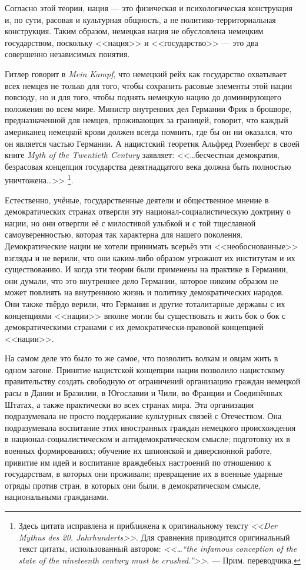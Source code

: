 Согласно этой теории, нация — это физическая и психологическая конструкция и, по сути, расовая и культурная общность, а не политико-территориальная конструкция. Таким образом, немецкая нация не обусловлена немецким государством, поскольку <<нация>> и <<государство>> — это два совершенно независимых понятия.

Гитлер говорит в \textit{Mein Kampf}, что немецкий рейх как государство охватывает всех немцев не только для того, чтобы сохранить расовые элементы этой нации повсюду, но и для того, чтобы поднять немецкую нацию до доминирующего положения во всем мире. Министр внутренних дел Германии Фрик в брошюре, предназначенной для немцев, проживающих за границей, говорит, что каждый американец немецкой крови должен всегда помнить, где бы он ни оказался, что он является частью Германии. А нацистский теоретик Альфред Розенберг в своей книге \textit{Myth of the Twentieth Century} заявляет: <<\ldots бесчестная демократия, безрасовая концепция государства девятнадцатого века должна быть полностью уничтожена\ldots>>
\footnote{%
Здесь цитата исправлена и приближена к оригинальному тексту \textit{<<Der Mythus des 20. Jahrhunderts>>}. Для сравнения приводится оригинальный текст цитаты, использованный автором: \textit{<<\ldots``the infamous conception of the state of the nineteenth century must be crushed.''>>}. — Прим. переводчика.}.

Естественно, учёные, государственные деятели и общественное мнение в демократических странах отвергли эту национал-социалистическую доктрину о нации, но они отвергли её с милостивой улыбкой и с той тщеславной самоуверенностью, которая так характерна для нашего поколения. Демократические нации не хотели принимать всерьёз эти <<необоснованные>> взгляды и не верили, что они каким-либо образом угрожают их институтам и их существованию. И когда эти теории были применены на практике в Германии, они думали, что это внутреннее дело Германии, которое никоим образом не может повлиять на внутреннюю жизнь и политику демократических народов. Они также твёрдо верили, что Германия и другие тоталитарные державы с их концепциями <<нации>> вполне могли бы существовать и жить бок о бок с демократическими странами с их демократически-правовой концепцией <<нации>>.

На самом деле это было то же самое, что позволить волкам и овцам жить в одном загоне. Принятие нацистской концепции нации позволило нацистскому правительству создать свободную от ограничений организацию граждан немецкой расы в Дании и Бразилии, в Югославии и Чили, во Франции и Соединённых Штатах, а также практически во всех странах мира. Эта организация подразумевала не просто поддержание культурных связей с Отечеством. Она подразумевала воспитание этих иностранных граждан немецкого происхождения в национал-социалистическом и антидемократическом смысле; подготовку их в военных формированиях; обучение их шпионской и диверсионной работе, привитие им идей и воспитание враждебных настроений по отношению к государствам, в которых они проживали; превращение их в военные ударные отряды против стран, в которых они были, в демократическом смысле, национальными гражданами.

